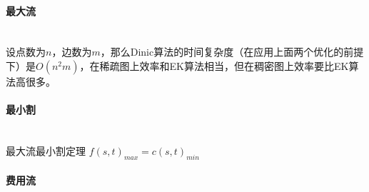 \paragraph{最大流}~{}
\\
设点数为$n$，边数为$m$，那么Dinic算法的时间复杂度（在应用上面两个优化的前提下）是$O(n^{2}m)$，在稀疏图上效率和EK算法相当，但在稠密图上效率要比EK算法高很多。
\paragraph{最小割}~{}
\\
最大流最小割定理 $f(s,t)_{max}=c(s,t)_{min}$
\paragraph{费用流}~{}
\\
